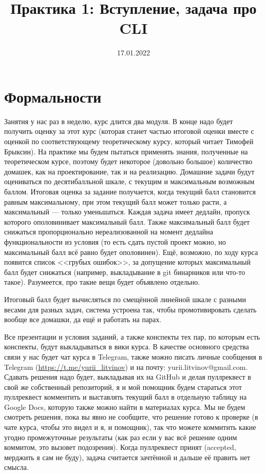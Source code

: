 \documentclass[a5paper]{article}
\title{Практика 1: Вступление, задача про CLI}
\date{17.01.2022}
\begin{document}
\maketitle
\thispagestyle{empty}

\section{Формальности}

Занятия у нас раз в неделю, курс длится два модуля. В конце надо будет получить оценку за этот курс (которая станет частью итоговой оценки вместе с оценкой по соответствующему теоретическому курсу, который читает Тимофей Брыксин). На практике мы будем пытаться применять знания, полученные на теоретическом курсе, поэтому будет некоторое (довольно большое) количество домашек, как на проектирование, так и на реализацию. Домашние задачи будут оцениваться по десятибалльной шкале, с текущим и максимальным возможным баллом. Итоговая оценка за задание получается, когда текущий балл становится равным максимальному, при этом текущий балл может только расти, а максимальный --- только уменьшаться. Каждая задача имеет дедлайн, пропуск которого ополовинивает максимальный балл. Также максимальный балл будет снижаться пропорционально нереализованной на момент дедлайна функциональности из условия (то есть сдать пустой проект можно, но максимальный балл всё равно будет ополовинен). Ещё, возможно, по ходу курса появится список <<грубых ошибок>>, за допущение которых максимальный балл будет снижаться (например, выкладывание в git бинарников или что-то такое). Разумеется, про такие вещи будет объявлено отдельно.

Итоговый балл будет вычисляться по смещённой линейной шкале с разными весами для разных задач, система устроена так, чтобы промотивировать сделать вообще все домашки, да ещё и работать на парах.

Все презентации и условия заданий, а также конспекты тех пар, по которым есть конспекты, будут выкладываться в вики курса. В качестве основного средства связи у нас будет чат курса в Telegram, также можно писать личные сообщения в Telegram (\url{https://t.me/yurii_litvinov}) и на почту: yurii.litvinov@gmail.com. Сдавать решения надо будет, выкладывая их на GitHub и делая пуллреквест в свой же собственный репозиторий, я и мой помощник будем стараться этот пуллреквест комментить и выставлять текущий балл в отдельную таблицу на Google Docs, которую также можно найти в материалах курса. Мы не будем смотреть решения, пока вы явно не сообщите, что решение готово к проверке (в чате курса, чтобы это видел и я, и помощник), так что можете коммитить какие угодно промежуточные результаты (как раз если у вас всё решение одним коммитом, это вызовет подозрения). Когда пуллреквест принят (accepted, мерджить я сам не буду), задача считается зачтённой и дальше её править нет смысла. 
\end{document}
